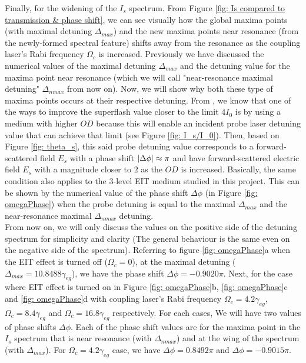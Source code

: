 Finally, for the widening of the $I_{s}$ spectrum. From Figure \ref{fig: Is compared to transmission & phase shift}, we can see visually how the global maxima points (with maximal detuning $\Delta_{max}$) and the new maxima points near resonance (from the newly-formed spectral feature) shifts away from the resonance as the coupling laser's Rabi frequency $\Omega_{c}$ is increased. Previously we have discussed the numerical values of the maximal detuning $\Delta_{max}$ and the detuning value for the maxima point near resonance (which we will call "near-resonance maximal detuning" $\Delta_{nmax}$ from now on). Now, we will show why both these type of maxima points occurs at their respective detuning. From \cite{Kwong2014, Kwong2017}, we know that one of the ways to improve the superflash value closer to the limit $4I_{0}$ is by using a medium with higher $OD$ because this will enable an incident probe laser detuning value that can achieve that limit (see Figure \ref{fig: I_s/I_0}). Then, based on Figure \ref{fig: theta_s}, this said probe detuning value corresponds to a forward-scattered field $E_{s}$ with a phase shift $\abs{\Delta\phi} \approx \pi$ and have forward-scattered electric field $E_{s}$ with a magnitude closer to $2$ as the $OD$ is increased. Basically, the same condition also applies to the 3-level EIT medium studied in this project. This can be shown by the numerical value of the phase shift $\Delta\phi$  (in Figure \ref{fig: omegaPhase}) when the probe detuning is equal to the maximal $\Delta_{max}$ and the near-resonance maximal $\Delta_{nmax}$ detuning.\\

From now on, we will only discuss the values on the positive side of the detuning spectrum for simplicity and clarity (The general behaviour is the same even on the negative side of the spectrum). Referring to figure \ref{fig: omegaPhase}a when the EIT effect is turned off ($\Omega_{c} = 0$), at the maximal detuning ($\Delta_{max} = 10.8488\gamma_{eg}$), we have the phase shift $\Delta\phi = -0.9020\pi$. Next, for the case where EIT effect is turned on in Figure \ref{fig: omegaPhase}b, \ref{fig: omegaPhase}c and \ref{fig: omegaPhase}d with coupling laser's Rabi frequency $\Omega_{c} = 4.2\gamma_{eg}$, $\Omega_{c} = 8.4\gamma_{eg}$ and $\Omega_{c} = 16.8\gamma_{eg}$ respectively. For each cases, We will have two values of phase shifts $\Delta\phi$. Each of the phase shift values are for the maxima point in the $I_{s}$ spectrum that is near resonance (with $\Delta_{nmax}$) and at the wing of the spectrum (with $\Delta_{max}$). For $\Omega_{c} = 4.2\gamma_{eg}$ case, we have $\Delta\phi = 0.8492\pi$ and $\Delta\phi = -0.9015\pi$.  

